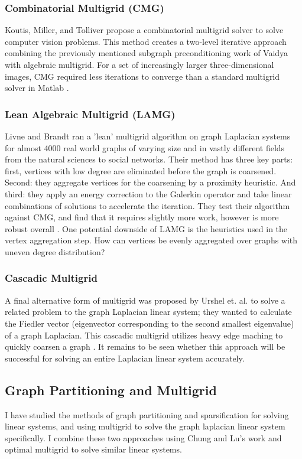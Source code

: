 \documentclass{article}
\begin{document}
\subsubsection{Combinatorial Multigrid (CMG)}
Koutis, Miller, and Tolliver propose a combinatorial multigrid solver to solve computer vision problems. This method creates a two-level iterative approach combining the previously mentioned subgraph preconditioning work of Vaidya with algebraic multigrid. For a set of increasingly larger three-dimensional images, CMG required less iterations to converge than a standard multigrid solver in Matlab \cite{Koutis:2011}.

\subsubsection{Lean Algebraic Multigrid (LAMG)}
Livne and Brandt ran a 'lean' multigrid algorithm on graph Laplacian systems for almost 4000 real world graphs of varying size and in vastly different fields from the natural sciences to social networks. Their method has three key parts: first, vertices with low degree are eliminated before the graph is coarsened. Second: they aggregate vertices for the coarsening by a proximity heuristic. And third: they apply an energy correction to the Galerkin operator and take linear combinations of solutions to
accelerate the iteration. They test their algorithm against CMG, and find that it requires slightly more work, however is more robust overall \cite{Livne:2012}. One potential downside of LAMG is
the heuristics used in the vertex aggregation step. How can vertices be evenly aggregated over graphs with uneven degree distribution?


\subsubsection{Cascadic Multigrid}
A final alternative form of multigrid was proposed by Urshel et. al. to solve a related problem to the graph Laplacian linear system; they wanted to calculate the Fiedler vector (eigenvector corresponding to the second smallest eigenvalue) of a graph Laplacian. This cascadic multigrid utilizes heavy edge maching to quickly coarsen a graph \cite{Urschel:2014}. It remains to be seen whether this approach will be successful for solving an entire Laplacian linear system accurately.

\subsection{Graph Partitioning and Multigrid}
I have studied the methods of graph partitioning and sparsification for solving linear systems, and using multigrid to solve the graph laplacian linear system specifically. I combine these two approaches using Chung and Lu's work \cite{Chung:2004} and optimal multigrid to solve similar linear systems.
%
%
\end{document}
